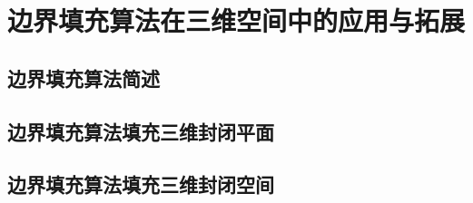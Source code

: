\section{边界填充算法在三维空间中的应用与拓展}
\subsection{边界填充算法简述}
\subsection{边界填充算法填充三维封闭平面}
\subsection{边界填充算法填充三维封闭空间}